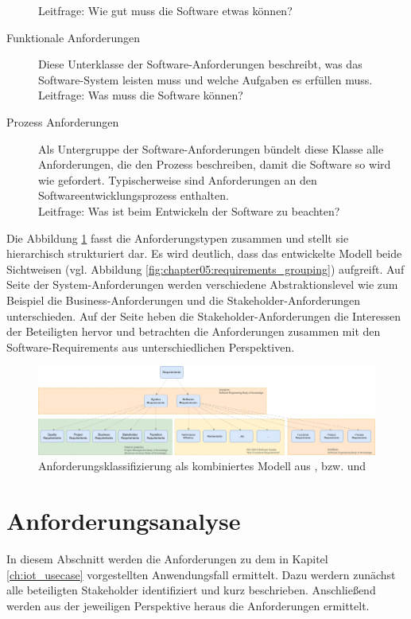 \begin{description}
  Leitfrage: \glqq Wie gut muss die Software etwas können? \grqq
  \item[Funktionale Anforderungen] Diese Unterklasse der Software-Anforderungen beschreibt, was das Software-System leisten muss und welche Aufgaben es erfüllen muss.\\
  Leitfrage: \glqq Was muss die Software können? \grqq
  \item[Prozess Anforderungen] Als Untergruppe der Software-Anforderungen bündelt diese Klasse alle Anforderungen, die den Prozess beschreiben, damit die Software so wird wie gefordert. Typischerweise sind Anforderungen an den Softwareentwicklungsprozess enthalten.\\
  Leitfrage: \glqq Was ist beim Entwickeln der Software zu beachten? \grqq
  \end{description}

Die Abbildung \ref{fig:chapter05:requirements_hierarchy} fasst die Anforderungstypen zusammen und stellt sie hierarchisch strukturiert dar. Es wird deutlich, dass das entwickelte Modell beide Sichtweisen (vgl. Abbildung \ref{fig:chapter05:requirements_grouping}) aufgreift. Auf Seite der System-Anforderungen werden verschiedene Abstraktionslevel wie zum Beispiel die Business-Anforderungen und die Stakeholder-Anforderungen unterschieden. Auf der Seite heben die Stakeholder-Anforderungen die Interessen der Beteiligten hervor und betrachten die Anforderungen zusammen mit den Software-Requirements aus unterschiedlichen Perspektiven.

\begin{figure}[htbp]
 \centering
 \includegraphics[width=1.0\textwidth]{gfx/Requirements_Hierarchy.png}
 \caption{Anforderungsklassifizierung als kombiniertes Modell aus \cite{SWEBOK}, \cite{PMBOK} bzw. \cite{BABOK} und \cite{ISO25010}}
 \label{fig:chapter05:requirements_hierarchy}
\end{figure}

%
%
\section{Anforderungsanalyse}
\label{sec:requirements:analysis}
In diesem Abschnitt werden die Anforderungen zu dem in Kapitel \ref{ch:iot_usecase} vorgestellten Anwendungsfall ermittelt. Dazu werdern zunächst alle beteiligten Stakeholder identifiziert und kurz beschrieben. Anschließend werden aus der jeweiligen Perspektive heraus die Anforderungen ermittelt.

